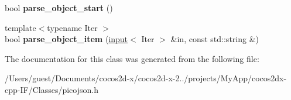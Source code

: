 \begin{DoxyCompactItemize}
\item 
\hypertarget{classpicojson_1_1null__parse__context_a95c208456592c33d53548fa88b831c7c}{bool {\bfseries parse\-\_\-object\-\_\-start} ()}\label{classpicojson_1_1null__parse__context_a95c208456592c33d53548fa88b831c7c}

\item 
\hypertarget{classpicojson_1_1null__parse__context_a97c4b81a984ea473fe56e09aed7b9ca6}{{\footnotesize template$<$typename Iter $>$ }\\bool {\bfseries parse\-\_\-object\-\_\-item} (\hyperlink{classpicojson_1_1input}{input}$<$ Iter $>$ \&in, const std\-::string \&)}\label{classpicojson_1_1null__parse__context_a97c4b81a984ea473fe56e09aed7b9ca6}

\end{DoxyCompactItemize}


The documentation for this class was generated from the following file\-:\begin{DoxyCompactItemize}
\item 
/\-Users/guest/\-Documents/cocos2d-\/x/cocos2d-\/x-\/2../projects/\-My\-App/cocos2dx-\/cpp-\/\-I\-F/\-Classes/picojson.\-h\end{DoxyCompactItemize}
